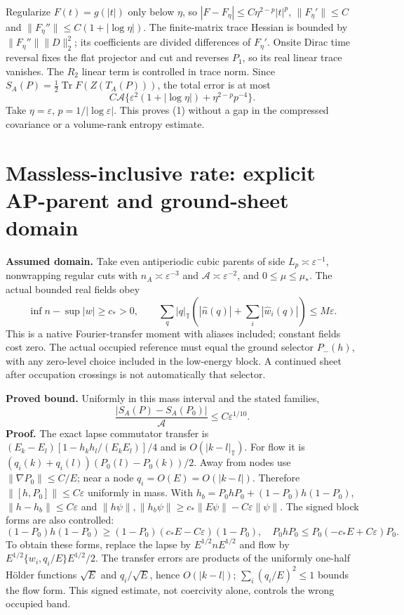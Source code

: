 \documentclass[10pt]{article}
\newcommand{\Tr}{\operatorname{Tr}}
\newcommand{\eps}{\varepsilon}
\begin{document}
Regularize $F(t)=g(|t|)$ only below $\eta$, so
$|F-F_\eta|\leq C\eta^{2-p}|t|^p$,
$\|F_\eta'\|\leq C$ and
$\|F_\eta''\|\leq C(1+|\log\eta|)$.
The finite-matrix trace Hessian is bounded by
$\|F_\eta''\|\|D\|_2^2$; its coefficients are divided differences
of $F_\eta'$. Onsite Dirac time reversal fixes the flat projector
and cut and reverses $P_1$, so its real linear trace vanishes.
The $R_2$ linear term is controlled in trace norm. Since
$S_A(P)=\frac12\Tr F(Z(T_A(P)))$, the total error is at most
\[
 C\mathcal A\{\eps^2(1+|\log\eta|)+\eta^{2-p}p^{-4}\}.
\]
Take $\eta=\eps$, $p=1/|\log\eps|$. This proves (1) without a gap
in the compressed covariance or a volume-rank entropy estimate.

\section{Massless-inclusive rate: explicit AP-parent and ground-sheet domain}
\textbf{Assumed domain.} Take even antiperiodic cubic parents of side
$L_p\asymp\eps^{-1}$, nonwrapping regular cuts with
$n_A\asymp\eps^{-3}$ and $\mathcal A\asymp\eps^{-2}$, and
$0\leq\mu\leq\mu_*$. The actual bounded real fields obey
\[
 \inf n-\sup|w|\geq c_*>0,\qquad
 \sum_q |q|_{\mathbb T}
   (|\widehat n(q)|+\sum_i|\widehat w_i(q)|)\leq M\eps.
\]
This is a native Fourier-transfer moment with aliases included; constant
fields cost zero. The actual occupied reference must equal the ground
selector $P_-(h)$, with any zero-level choice included in the low-energy
block. A continued sheet after occupation crossings is not automatically
that selector.

\textbf{Proved bound.} Uniformly in this mass interval and the stated
families,
\begin{equation}
 \boxed{\displaystyle
 \frac{|S_A(P)-S_A(P_0)|}{\mathcal A}\leq C\eps^{1/10}.} \tag{2}
\end{equation}
\textbf{Proof.} The exact lapse commutator transfer is
$(E_k-E_l)[1-h_kh_l/(E_kE_l)]/4$ and is $O(|k-l|_{\mathbb T})$.
For flow it is $(q_i(k)+q_i(l))(P_0(l)-P_0(k))/2$.
Away from nodes use $\|\nabla P_0\|\leq C/E$; near a node
$q_i=O(E)=O(|k-l|)$. Therefore $\|[h,P_0]\|\leq C\eps$ uniformly
in mass. With $h_b=P_0hP_0+(1-P_0)h(1-P_0)$,
$\|h-h_b\|\leq C\eps$ and
$\|h\psi\|,\|h_b\psi\|\geq c_*\|E\psi\|-C\eps\|\psi\|$.
The signed block forms are also controlled:
\[
 (1-P_0)h(1-P_0)\geq(1-P_0)(c_*E-C\eps)(1-P_0),\quad
 P_0hP_0\leq P_0(-c_*E+C\eps)P_0.
\]
To obtain these forms, replace the lapse by $E^{1/2}nE^{1/2}$
and flow by $E^{1/2}\{w_i,q_i/E\}E^{1/2}/2$.
The transfer errors are products of the uniformly one-half H\"older
functions $\sqrt E$ and $q_i/\sqrt E$, hence $O(|k-l|)$;
$\sum_i(q_i/E)^2\leq1$ bounds the flow form. This signed estimate,
not coercivity alone, controls the wrong occupied band.
\end{document}
